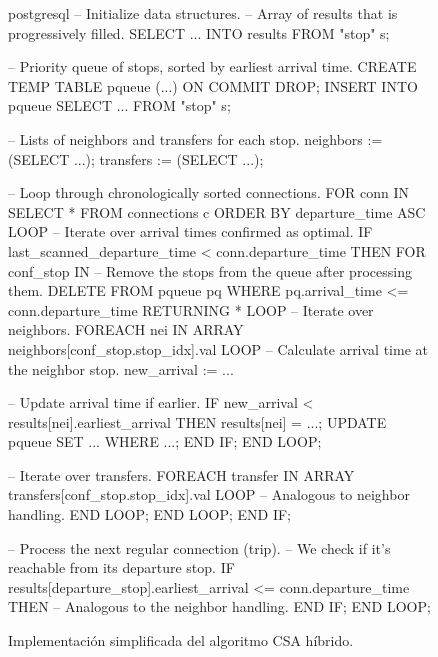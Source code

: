 \begin{figure}[p]
    \centering
    \begin{lnhuggedminted}[width=14.2cm]{postgresql}
-- Initialize data structures.
-- Array of results that is progressively filled.
SELECT ... INTO results FROM "stop" s;

-- Priority queue of stops, sorted by earliest arrival time.
CREATE TEMP TABLE pqueue (...) ON COMMIT DROP;
INSERT INTO pqueue SELECT ... FROM "stop" s;

-- Lists of neighbors and transfers for each stop.
neighbors := (SELECT ...); transfers := (SELECT ...);

-- Loop through chronologically sorted connections.
FOR conn IN
    SELECT *
    FROM connections c
    ORDER BY departure_time ASC
LOOP
    -- Iterate over arrival times confirmed as optimal.
    IF last_scanned_departure_time < conn.departure_time THEN
        FOR conf_stop IN
            -- Remove the stops from the queue after processing them.
            DELETE FROM pqueue pq
            WHERE pq.arrival_time <= conn.departure_time
            RETURNING *
        LOOP
            -- Iterate over neighbors.
            FOREACH nei IN ARRAY neighbors[conf_stop.stop_idx].val
            LOOP
                -- Calculate arrival time at the neighbor stop.
                new_arrival := ...

                -- Update arrival time if earlier.
                IF new_arrival < results[nei].earliest_arrival THEN
                    results[nei] = ...;
                    UPDATE pqueue SET ... WHERE ...;
                END IF;
            END LOOP;

            -- Iterate over transfers.
            FOREACH transfer IN ARRAY transfers[conf_stop.stop_idx].val
            LOOP
                -- Analogous to neighbor handling.
            END LOOP;
        END LOOP;
    END IF;

    -- Process the next regular connection (trip).
    -- We check if it's reachable from its departure stop.
    IF results[departure_stop].earliest_arrival <= conn.departure_time THEN
        -- Analogous to the neighbor handling.
    END IF;
END LOOP;
    \end{lnhuggedminted}
    \caption{Implementación simplificada del algoritmo CSA híbrido.}
    \label{design:modified_csa}
\end{figure}






